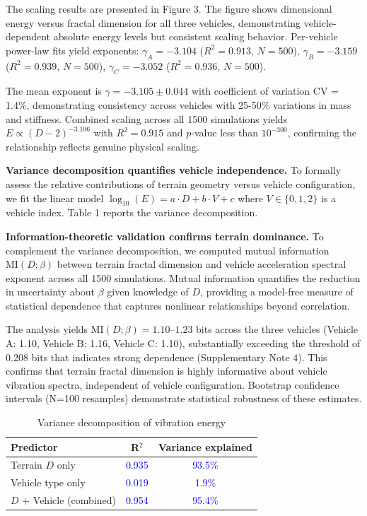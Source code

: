 \documentclass[11pt]{article}
\begin{document}
The scaling results are presented in Figure 3. The figure shows dimensional energy versus fractal dimension for all three vehicles, demonstrating vehicle-dependent absolute energy levels but consistent scaling behavior. Per-vehicle power-law fits yield exponents: $\gamma_A = -3.104$ ($R^2 = 0.913$, $N = 500$), $\gamma_B = -3.159$ ($R^2 = 0.939$, $N = 500$), $\gamma_C = -3.052$ ($R^2 = 0.936$, $N = 500$). 

The mean exponent is $\gamma = -3.105 \pm 0.044$ with coefficient of variation CV = 1.4\%, demonstrating consistency across vehicles with 25-50\% variations in mass and stiffness. Combined scaling across all 1500 simulations yields $E \propto (D-2)^{-3.106}$ with $R^2 = 0.915$ and $p$-value less than $10^{-300}$, confirming the relationship reflects genuine physical scaling.

\textbf{Variance decomposition quantifies vehicle independence.} To formally assess the relative contributions of terrain geometry versus vehicle configuration, we fit the linear model $\log_{10}(E) = a \cdot D + b \cdot V + c$ where $V \in \{0,1,2\}$ is a vehicle index. Table 1 reports the variance decomposition.

\textbf{Information-theoretic validation confirms terrain dominance.} To complement the variance decomposition, we computed mutual information $\text{MI}(D;\beta)$ between terrain fractal dimension and vehicle acceleration spectral exponent across all 1500 simulations. Mutual information quantifies the reduction in uncertainty about $\beta$ given knowledge of $D$, providing a model-free measure of statistical dependence that captures nonlinear relationships beyond correlation\cite{Cover2006}. 

The analysis yields $\text{MI}(D;\beta) = 1.10$--$1.23$ bits across the three vehicles (Vehicle A: 1.10, Vehicle B: 1.16, Vehicle C: 1.10), substantially exceeding the threshold of 0.208 bits that indicates strong dependence (Supplementary Note 4). This confirms that terrain fractal dimension is highly informative about vehicle vibration spectra, independent of vehicle configuration. Bootstrap confidence intervals (N=100 resamples) demonstrate statistical robustness of these estimates.

\begin{table}[h]
\centering
\caption{Variance decomposition of vibration energy}
\begin{tabular}{lcc}
\hline
Predictor & R$^2$ & Variance explained \\
\hline
Terrain $D$ only & \textcolor{blue}{0.935} & \textcolor{blue}{93.5\%} \\
Vehicle type only & \textcolor{blue}{0.019} & \textcolor{blue}{1.9\%} \\
$D$ + Vehicle (combined) & \textcolor{blue}{0.954} & \textcolor{blue}{95.4\%} \\
\hline
\end{tabular}
\label{tab:variance}
\end{table}
\end{document}
